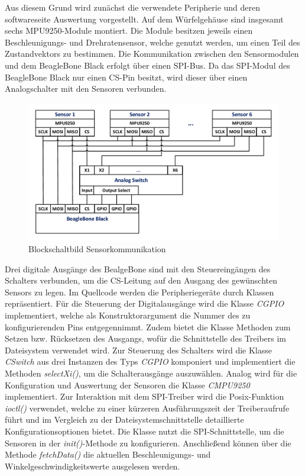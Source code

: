 Aus diesem Grund wird zunächst die verwendete Peripherie und deren softwareseite Auswertung vorgestellt. Auf dem Würfelgehäuse sind insgesamt sechs MPU9250-Module \cite{MPU9250} montiert. Die Module besitzen jeweils einen Beschleunigungs- und Drehratensensor, welche genutzt werden, um einen Teil des Zustandvektors zu bestimmen. Die Kommunikation zwischen den Sensormodulen und dem BeagleBone Black erfolgt über einen SPI-Bus. Da das SPI-Modul des BeagleBone Black nur einen CS-Pin besitzt, wird dieser über einen Analogschalter \cite{MAX4617} mit den Sensoren verbunden.
\begin{figure}[!h]
\centering
\includegraphics[width=0.7\linewidth]{img/SW_0_Sensoren_BSB.pdf}
\caption{Blockschaltbild Sensorkommunikation}
\end{figure}
Drei digitale Ausgänge des BealgeBone sind mit den Steuereingängen des Schalters verbunden, um die CS-Leitung auf den Ausgang des gewünschten Sensors zu legen.
Im Quellcode werden die Peripheriegeräte durch Klassen repräsentiert. Für die Steuerung der Digitalausgänge wird die Klasse \textit{CGPIO} implementiert, welche als Konstruktorargument die Nummer des zu konfigurierenden Pins entgegennimmt. Zudem bietet die Klasse Methoden zum Setzen bzw. Rücksetzen des Ausgangs, wofür die Schnittstelle des Treibers im Dateisystem verwendet wird. Zur Steuerung des Schalters wird die Klasse \textit{CSwitch} aus drei Instanzen des Typs \textit{CGPIO} komponiert und implementiert die Methoden \textit{selectXi()}, um die Schalterausgänge auszuwählen.
Analog wird für die Konfiguration und Auswertung der Sensoren die Klasse \textit{CMPU9250} implementiert. Zur Interaktion mit dem SPI-Treiber wird die Posix-Funktion \textit{ioctl()} verwendet, welche zu einer kürzeren Ausführungszeit der Treiberaufrufe führt und im Vergleich zu der Dateisystemschnittstelle detaillierte Konfigurationsoptionen bietet. Die Klasse nutzt die SPI-Schnittstelle, um die Sensoren in der \textit{init()}-Methode zu konfigurieren. Anschließend können über die Methode \textit{fetchData()} die aktuellen Beschleunigungs- und Winkelgeschwindigkeitswerte ausgelesen werden.

